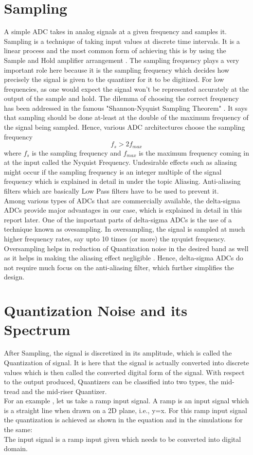 \documentclass[colorlinks=true,pdfstartview=FitV,linkcolor=blue,
            citecolor=red,urlcolor=magenta]{ligodoc}
\begin{document}
\section{Sampling} A simple ADC takes in analog signals at a given frequency and samples it. Sampling is a technique of taking input values at discrete time intervals. It is a linear process and the most common form of achieving this is by using the Sample and Hold amplifier arrangement \cite{Oppenheim}. The sampling frequency plays a very important role here because it is the sampling frequency which decides how precisely the signal is given to the quantizer for it to be digitized. For low frequencies, as one would expect the signal won't be represented accurately at the output of the sample and hold. The dilemma of choosing the correct frequency has been addressed in the famous "Shannon-Nyquist Sampling Theorem" \cite{Oppenheim}. It says that sampling should be done at-least at the double of the maximum frequency of the signal being sampled. Hence, various ADC architectures choose the sampling frequency 
 \begin{equation}
 f_{s}>2f_{max}
 \end{equation}
 where $f_{s}$ is the sampling frequency and $f_{max}$ is the maximum frequency coming in at the input called the Nyquist Frequency. 
 Undesirable effects such as aliasing might occur if the sampling frequency is an integer multiple of the signal frequency which is explained in detail in \cite{Oppenheim} under the topic Aliasing. Anti-aliasing filters which are basically Low Pass filters have to be used to prevent it.\\ 
Among various types of ADCs that are commercially available, the delta-sigma ADCs provide major advantages in our case, which is explained in detail in this report later. One of the important parts of delta-sigma ADCs is the use of a technique known as ovesampling. In oversampling, the signal is sampled at much higher frequency rates, say upto 10 times (or more) the nyquist frequency. Oversampling helps in reduction of Quantization noise in the desired band as well as it helps in making the aliasing effect negligible \cite{Basic_Sigma}. Hence, delta-sigma ADCs do not require much focus on the anti-aliasing filter, which further simplifies the design.
 \section{Quantization Noise and its Spectrum}
 After Sampling, the signal is discretized in its amplitude, which is called the Quantization of signal. It is here that the signal is actually converted into discrete values which is then called the converted digital form of the signal. 
 With respect to the output produced, Quantizers can be classified into two types, the mid-tread and the mid-riser Quantizer.\\
 For an example \cite{Wikipedia}, let us take a ramp input signal. A ramp is an input signal which is a straight line when drawn on a 2D plane, i.e., y=x. For this ramp input signal the quantization is achieved as shown in the equation and in the simulations for the same:\\
 The input signal is a ramp input given which needs to be converted into digital domain.
\end{document}
